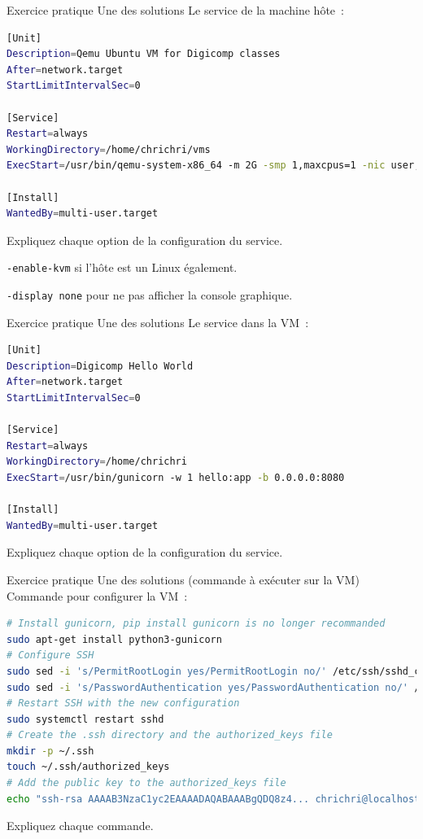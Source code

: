 \documentclass{beamer}
\begin{document}
    \begin{frame}[fragile]{Exercice pratique \execcounterdispinc{}}{Une des solutions}
        Le service de la machine hôte~:
        \begin{lstlisting}[language=bash]
[Unit]
Description=Qemu Ubuntu VM for Digicomp classes
After=network.target
StartLimitIntervalSec=0

[Service]
Restart=always
WorkingDirectory=/home/chrichri/vms
ExecStart=/usr/bin/qemu-system-x86_64 -m 2G -smp 1,maxcpus=1 -nic user,hostfwd=tcp::5022-:22,hostfwd=tcp::5080-:8080 -display none -hda linux.qcow2 -k fr -enable-kvm

[Install]
WantedBy=multi-user.target
        \end{lstlisting}
        Expliquez chaque option de la configuration du service.
        \pause
        \begin{dangercolorbox}
            \lstinline{-enable-kvm} si l'hôte est un Linux également.

            \lstinline{-display none} pour ne pas afficher la console graphique.
        \end{dangercolorbox}
    \end{frame}

    \begin{frame}[fragile]{Exercice pratique \execcounterdispinc{}}{Une des solutions}
        Le service dans la VM~:
        \begin{lstlisting}[language=bash]
[Unit]
Description=Digicomp Hello World
After=network.target
StartLimitIntervalSec=0

[Service]
Restart=always
WorkingDirectory=/home/chrichri
ExecStart=/usr/bin/gunicorn -w 1 hello:app -b 0.0.0.0:8080

[Install]
WantedBy=multi-user.target
        \end{lstlisting}
        Expliquez chaque option de la configuration du service.
    \end{frame}

    \begin{frame}[fragile]{Exercice pratique \execcounterdispinc{}}{Une des solutions (commande à exécuter sur la VM)}
        Commande pour configurer la VM~:
        \begin{lstlisting}[language=bash]
# Install gunicorn, pip install gunicorn is no longer recommanded
sudo apt-get install python3-gunicorn
# Configure SSH
sudo sed -i 's/PermitRootLogin yes/PermitRootLogin no/' /etc/ssh/sshd_config
sudo sed -i 's/PasswordAuthentication yes/PasswordAuthentication no/' /etc/ssh/sshd_config
# Restart SSH with the new configuration
sudo systemctl restart sshd
# Create the .ssh directory and the authorized_keys file
mkdir -p ~/.ssh
touch ~/.ssh/authorized_keys
# Add the public key to the authorized_keys file
echo "ssh-rsa AAAAB3NzaC1yc2EAAAADAQABAAABgQDQ8z4... chrichri@localhost" >> ~/.ssh/authorized_keys
        \end{lstlisting}
        Expliquez chaque commande.
    \end{frame}
\end{document}
